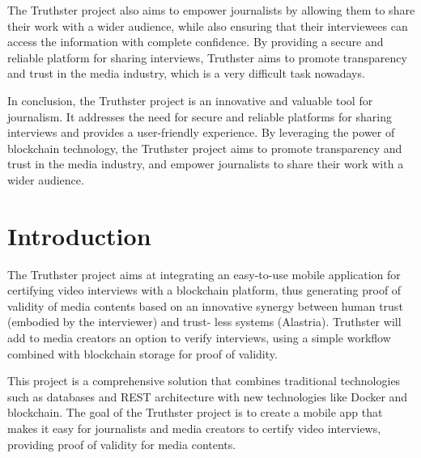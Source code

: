 \documentclass[target=mst,aauheader=]{thud}
\begin{document}
The Truthster project also aims to empower journalists by allowing them to share their work with a wider audience, while also ensuring that their interviewees can access the information with complete confidence. By providing a secure and reliable platform for sharing interviews, Truthster aims to promote transparency and trust in the media industry, which is a very difficult task nowadays.

In conclusion, the Truthster project is an innovative and valuable tool for journalism. It addresses the need for secure and reliable platforms for sharing interviews and provides a user-friendly experience. By leveraging the power of blockchain technology, the Truthster project aims to promote transparency and trust in the media industry, and empower journalists to share their work with a wider audience.

\tableofcontents

\listoftables

\listoffigures



\mainmatter


\chapter{Introduction}

The Truthster project aims at integrating an easy-to-use mobile application for certifying video interviews with a blockchain platform, thus generating proof of validity of media contents based on an innovative synergy between human trust (embodied by the interviewer) and trust- less systems (Alastria). Truthster will add to media creators an option to verify interviews, using a simple workflow combined with blockchain storage for proof of validity.

This project is a comprehensive solution that combines traditional technologies such as databases and REST architecture with new technologies like Docker and blockchain. The goal of the Truthster project is to create a mobile app that makes it easy for journalists and media creators to certify video interviews, providing proof of validity for media contents.
\end{document}
